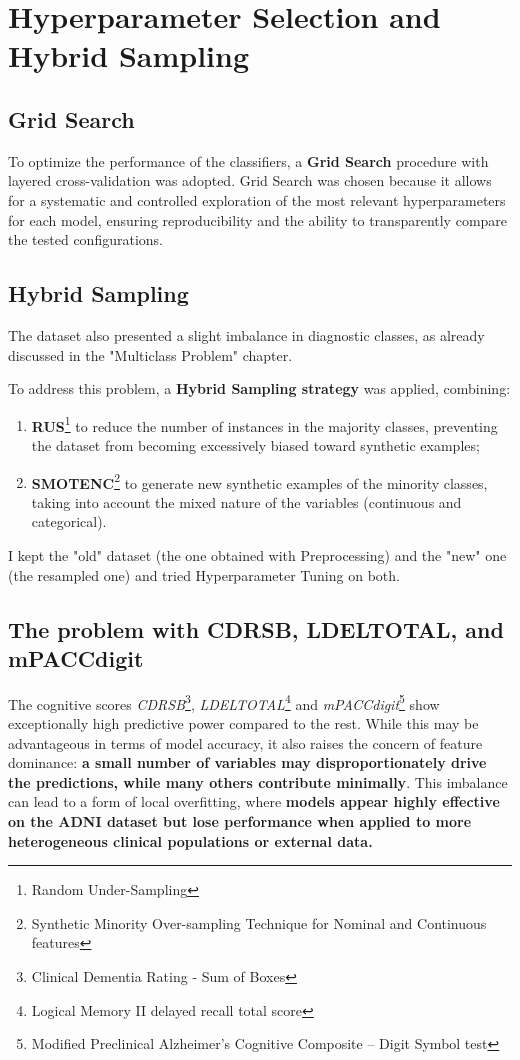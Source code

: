 \section{Hyperparameter Selection and Hybrid Sampling}
\subsection{Grid Search}
To optimize the performance of the classifiers, a \textbf{Grid Search} procedure with layered cross-validation was adopted. Grid Search was chosen because it allows for a systematic and controlled exploration of the most relevant hyperparameters for each model, ensuring reproducibility and the ability to transparently compare the tested configurations.

\subsection{Hybrid Sampling}
The dataset also presented a slight imbalance in diagnostic classes, as already discussed in the "Multiclass Problem" chapter. 

To address this problem, a \textbf{Hybrid Sampling strategy} was applied, combining:

\newpage

\begin{enumerate}
	\item \textbf{RUS}\footnote{Random Under-Sampling} to reduce the number of instances in the majority classes, preventing the dataset from becoming excessively biased toward synthetic examples;
	\item \textbf{SMOTENC}\footnote{Synthetic Minority Over-sampling Technique for Nominal and Continuous features} to generate new synthetic examples of the minority classes, taking into account the mixed nature of the variables (continuous and categorical).
\end{enumerate}
I kept the "old" dataset (the one obtained with Preprocessing) and the "new" one (the resampled one) and tried Hyperparameter Tuning on both. 

\subsection{The problem with CDRSB, LDELTOTAL, and mPACCdigit}
The cognitive scores \textit{CDRSB}\footnote{Clinical Dementia Rating - Sum of Boxes}, \textit{LDELTOTAL}\footnote{Logical Memory II delayed recall total score} and \textit{mPACCdigit}\footnote{Modified Preclinical Alzheimer’s Cognitive Composite – Digit Symbol test} show exceptionally high predictive power compared to the rest. While this may be advantageous in terms of model accuracy, it also raises the concern of feature dominance: \textbf{a small number of variables may disproportionately drive the predictions, while many others contribute minimally}. This imbalance can lead to a form of local overfitting, where \textbf{models appear highly effective on the ADNI dataset but lose performance when applied to more heterogeneous clinical populations or external data.}


